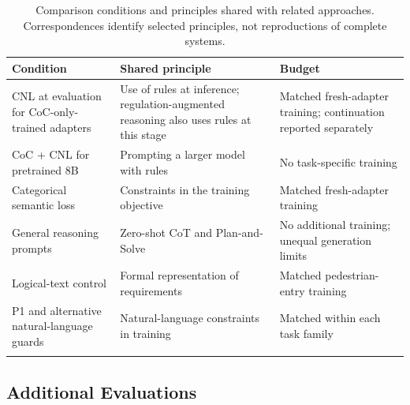 \begin{table}[tbp]
\caption{Comparison conditions and principles shared with related approaches.
Correspondences identify selected principles, not reproductions of complete
systems.}\label{tab:setup-related-controls}
\footnotesize
\begin{tabularx}{\textwidth}{@{}>{\raggedright\arraybackslash}X>{\raggedright\arraybackslash}X>{\raggedright\arraybackslash}p{}@{}}
\toprule
Condition & Shared principle & Budget\\
\midrule
CNL at evaluation for CoC-only-trained adapters & Use of rules at inference;
regulation-augmented reasoning also uses rules at this stage~\cite{r7} &
Matched fresh-adapter training; continuation reported separately\\[4pt]
CoC + CNL for pretrained 8B & Prompting a larger model with rules & No
task-specific training\\[4pt]
Categorical semantic loss & Constraints in the training objective~\cite{Xu2018}
& Matched fresh-adapter training\\[4pt]
General reasoning prompts & Zero-shot CoT and Plan-and-Solve~\cite{r16,r17}
& No additional training; unequal generation limits\\[4pt]
Logical-text control & Formal representation of requirements~\cite{r8,r9}
& Matched pedestrian-entry training\\[4pt]
P1 and alternative natural-language guards & Natural-language constraints in
training~\cite{r4} & Matched within each task family\\
\botrule
\end{tabularx}
\end{table}

\subsection{Additional Evaluations}\label{sec:setup-additional}

